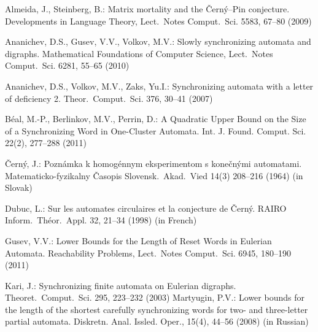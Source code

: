 \documentclass[11pt]{llncs}
\begin{document}
\begin{thebibliography}{99}
Almeida, J., Steinberg, B.: Matrix mortality and the \v{C}ern\'{y}--Pin
conjecture. Developments in
Language Theory, Lect.\ Notes Comput.\ Sci. 5583, 67--80 (2009)

Ananichev, D.S., Gusev, V.V., Volkov, M.V.: Slowly synchronizing automata and
digraphs. Mathematical Foundations of Computer Science, Lect.\ Notes Comput.\ Sci. 6281, 55--65 (2010)

Ananichev, D.S., Volkov, M.V., Zaks, Yu.I.: Synchronizing automata
with a letter of deficiency 2. Theor.\ Comput.\ Sci. 376, 30--41 (2007)

B\'{e}al, M.-P., Berlinkov, M.V., Perrin, D.: A Quadratic Upper Bound on the Size of a Synchronizing Word
in One-Cluster Automata. Int. J. Found. Comput. Sci. 22(2), 277--288 (2011)

\v{C}ern\'{y}, J.: Pozn\'{a}mka k homog\'{e}nnym eksperimentom s
kone\v{c}n\'{y}mi automatami. Matematicko-fyzikalny \v{C}asopis
Slovensk.\ Akad.\ Vied 14(3) 208--216 (1964) (in Slovak)

Dubuc, L.: Sur les automates circulaires et la conjecture de
\v{C}ern\'y. RAIRO Inform.\ Th\'eor.\ Appl. 32, 21--34 (1998) (in
French)
%
%
%
%

Gusev, V.V.: Lower Bounds for the Length of Reset Words in Eulerian Automata.
Reachability Problems, Lect.\ Notes Comput.\ Sci. 6945, 180--190 (2011)

Kari, J.: Synchronizing finite automata on Eulerian digraphs.
Theoret.\ Comput.\ Sci. 295, 223--232 (2003)
%
Martyugin, P.V.: Lower bounds for the length of the shortest carefully synchronizing
words for two- and three-letter partial automata. Diskretn. Anal. Issled. Oper., 15(4), 44--56 (2008)
(in Russian)


\end{thebibliography}
\end{document}
